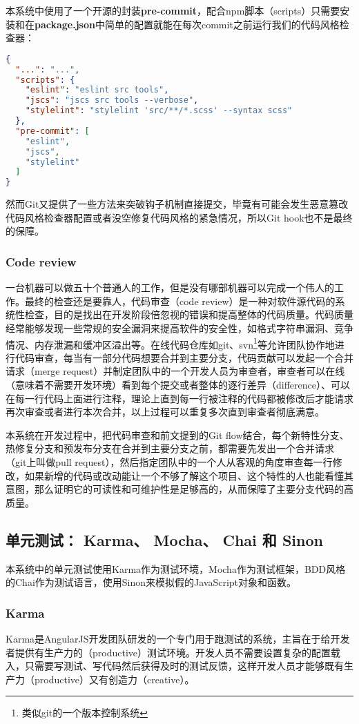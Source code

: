 本系统中使用了一个开源的封装\textbf{pre-commit}，配合npm脚本（scripts）只需要安装和在\textbf{package.json}中简单的配置就能在每次commit之前运行我们的代码风格检查器：
\begin{lstlisting}[language={json}, caption={package.json中的pre-commit设置部分}]
{
  "...": "...",
  "scripts": {
    "eslint": "eslint src tools",
    "jscs": "jscs src tools --verbose",
    "stylelint": "stylelint 'src/**/*.scss' --syntax scss"
  },
  "pre-commit": [
    "eslint",
    "jscs",
    "stylelint"
  ]
}
\end{lstlisting}

然而Git又提供了一些方法来突破钩子机制直接提交，毕竟有可能会发生恶意篡改代码风格检查器配置或者没空修复代码风格的紧急情况，所以Git hook也不是最终的保障。
\subsubsection{Code review}
一台机器可以做五十个普通人的工作，但是没有哪部机器可以完成一个伟人的工作\supercite{hubbard2015one}。最终的检查还是要靠人，代码审查（code review）是一种对软件源代码的系统性检查，目的是找出在开发阶段倍忽视的错误和提高整体的代码质量。代码质量经常能够发现一些常规的安全漏洞来提高软件的安全性，如格式字符串漏洞、竞争情况、内存泄漏和缓冲区溢出等。在线代码仓库如git、svn\footnote{类似git的一个版本控制系统}等允许团队协作地进行代码审查，每当有一部分代码想要合并到主要分支，代码贡献可以发起一个合并请求（merge request）并制定团队中的一个开发人员为审查者，审查者可以在线（意味着不需要开发环境）看到每个提交或者整体的逐行差异（difference）、可以在每一行代码上面进行注释，理论上直到每一行被注释的代码都被修改后才能请求再次审查或者进行本次合并，以上过程可以重复多次直到审查者彻底满意。

本系统在开发过程中，把代码审查和前文提到的Git flow结合，每个新特性分支、热修复分支和预发布分支在合并到主要分支之前，都需要先发出一个合并请求（git上叫做pull request），然后指定团队中的一个人从客观的角度审查每一行修改，如果新增的代码或改动能让一个不够了解这个项目、这个特性的人也能看懂其意图，那么证明它的可读性和可维护性是足够高的，从而保障了主要分支代码的高质量。
\subsection{单元测试： Karma、 Mocha、 Chai 和 Sinon}
本系统中的单元测试使用Karma作为测试环境，Mocha作为测试框架，BDD风格的Chai作为测试语言，使用Sinon来模拟假的JavaScript对象和函数。
\subsubsection{Karma}
Karma是AngularJS开发团队研发的一个专门用于跑测试的系统，主旨在于给开发者提供有生产力的（productive）测试环境。开发人员不需要设置复杂的配置载入，只需要写测试、写代码然后获得及时的测试反馈，这样开发人员才能够既有生产力（productive）又有创造力（creative）。

